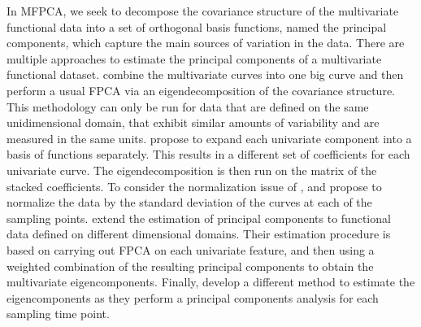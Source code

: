 In MFPCA, we seek to decompose the covariance structure of the multivariate functional data into a set of orthogonal basis functions, named the principal components, which capture the main sources of variation in the data. There are multiple approaches to estimate the principal components of a multivariate functional dataset. \cite{ramsayFunctionalDataAnalysis2005} combine the multivariate curves into one big curve and then perform a usual FPCA via an eigendecomposition of the covariance structure. This methodology can only be run for data that are defined on the same unidimensional domain, that exhibit similar amounts of variability and are measured in the same units. \cite{jacquesModelbasedClusteringMultivariate2014a} propose to expand each univariate component into a basis of functions separately. This results in a different set of coefficients for each univariate curve. The eigendecomposition is then run on the matrix of the stacked coefficients. To consider the normalization issue of \cite{ramsayFunctionalDataAnalysis2005}, \cite{jacquesModelbasedClusteringMultivariate2014a} and \cite{chiouMultivariateFunctionalPrincipal2014} propose to normalize the data by the standard deviation of the curves at each of the sampling points. \cite{happMultivariateFunctionalPrincipal2018a} extend the estimation of principal components to functional data defined on different dimensional domains. Their estimation procedure is based on carrying out FPCA on each univariate feature, and then using a weighted combination of the resulting principal components to obtain the multivariate eigencomponents. Finally, \cite{berrenderoPrincipalComponentsMultivariate2011} develop a different method to estimate the eigencomponents as they perform a principal components analysis for each sampling time point.

